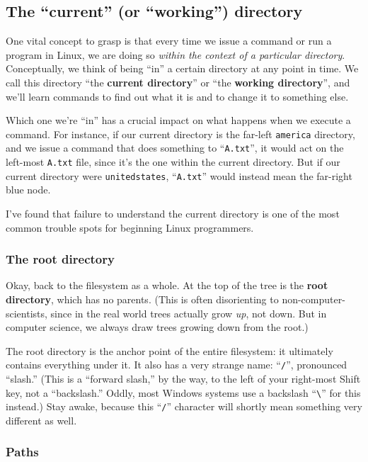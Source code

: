 \subsection{The ``current'' (or ``working'') directory}

One vital concept to grasp is that every time we issue a command or run a
program in Linux, we are doing so \textit{within the context of a particular
directory}. Conceptually, we think of being ``in'' a certain directory at any
point in time. We call this directory ``the \textbf{current directory}'' or
``the \textbf{working directory}'', and we'll learn commands to find out what
it is and to change it to something else.

Which one we're ``in'' has a crucial impact on what happens when we execute a
command. For instance, if our current directory is the far-left
\texttt{america} directory, and we issue a command that does something to
``\texttt{A.txt}'', it would act on the left-most \texttt{A.txt} file, since
it's the one within the current directory. But if our current directory were
\texttt{unitedstates}, ``\texttt{A.txt}'' would instead mean the far-right blue
node.

I've found that failure to understand the current directory is one of the most
common trouble spots for beginning Linux programmers.

\subsubsection{The root directory}

Okay, back to the filesystem as a whole. At the top of the tree is the
\textbf{root directory}, which has no parents. (This is often disorienting to
non-computer-scientists, since in the real world trees actually grow
\textit{up}, not down. But in computer science, we always draw trees growing
down from the root.)

The root directory is the anchor point of the entire filesystem: it ultimately
contains everything under it. It also has a very strange name: ``\texttt{/}'',
pronounced ``slash.'' (This is a ``forward slash,'' by the way, to the left of
your right-most Shift key, not a ``backslash.'' Oddly, most Windows systems
use a backslash ``\texttt{\textbackslash}'' for this instead.) Stay awake,
because this ``\texttt{/}'' character will shortly mean something very
different as well.

\subsubsection{Paths}

